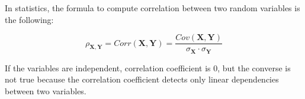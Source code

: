 \documentclass{beamer}
\begin{document}
\begin{frame}

\justifying
In statistics, the formula to compute correlation between two random variables is the following:

\begin{block}
\justifying
$$
\rho_{\mathbf{X},\mathbf{Y}} = Corr(\mathbf{X},\mathbf{Y}) = \frac{Cov(\mathbf{X},\mathbf{Y})}{\sigma_{\mathbf{X}}\cdot\sigma_{\mathbf{Y}}}
$$
\end{block}

\vspace{0.8cm}
\justifying
If the variables are independent, correlation coefficient is $0$, but the converse is not true because the correlation coefficient detects only linear dependencies between two variables.

\end{frame}
\end{document}
